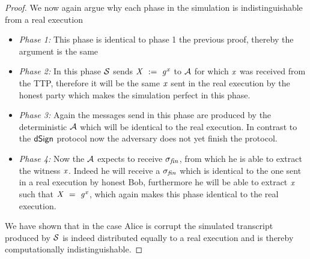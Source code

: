 \begin{proof}
    We now again argue why each phase in the simulation is indistinguishable from a real execution
    \begin{itemize}
        \item \textit{Phase 1:} This phase is identical to phase 1 the previous proof, thereby the argument is the same
        \item \textit{Phase 2:} In this phase $\mathcal{S}$ sends $\mathit{X} ~:=~ \mathit{g}^{\mathit{x}}$ to $\mathcal{A}$ for which $\mathit{x}$ was received from the TTP, therefore it will be the same $\mathit{x}$ sent in the real execution by the honest party which makes the simulation perfect in this phase.
        \item \textit{Phase 3:} Again the messages send in this phase are produced by the deterministic $\mathcal{A}$ which will be identical to the real execution.
        In contrast to the $\mathsf{dSign}$ protocol now the adversary does not yet finish the protocol.
        \item \textit{Phase 4:} Now the $\mathcal{A}$ expects to receive $\sigma_{\mathit{fin}}$, from which he is able to extract the witness $\mathit{x}$.
        Indeed he will receive a $\sigma_{\mathit{fin}}$ which is identical to the one sent in a real execution by honest Bob, furthermore he will be able to extract $\mathit{x}$ such that $\mathit{X} ~=~ \mathit{g}^{\mathit{x}}$, which again makes this phase identical to the real execution.
    \end{itemize}

    We have shown that in the case Alice is corrupt the simulated transcript produced by $\mathcal{S}$ is indeed distributed equally to a real execution and is thereby computationally indistinguishable.


\end{proof}
